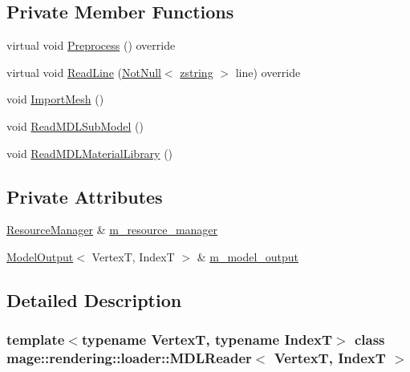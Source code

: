 \subsection*{Private Member Functions}
\begin{DoxyCompactItemize}
\item 
virtual void \mbox{\hyperlink{classmage_1_1rendering_1_1loader_1_1_m_d_l_reader_a397f0c0eedc56c983fc3a7074aa4e577}{Preprocess}} () override
\item 
virtual void \mbox{\hyperlink{classmage_1_1rendering_1_1loader_1_1_m_d_l_reader_a121bfa0a48d01bdc37cf09b7f3a25a27}{Read\+Line}} (\mbox{\hyperlink{namespacemage_a8769f9d670d6b585ea306cb1062af94b}{Not\+Null}}$<$ \mbox{\hyperlink{namespacemage_a4163ec9a9a27d5e7f4b452dcb99cb2b9}{zstring}} $>$ line) override
\item 
void \mbox{\hyperlink{classmage_1_1rendering_1_1loader_1_1_m_d_l_reader_a512618ed9e79671dbcb468d155272b7e}{Import\+Mesh}} ()
\item 
void \mbox{\hyperlink{classmage_1_1rendering_1_1loader_1_1_m_d_l_reader_afe15d41185ac5f4de6607561d7068d8c}{Read\+M\+D\+L\+Sub\+Model}} ()
\item 
void \mbox{\hyperlink{classmage_1_1rendering_1_1loader_1_1_m_d_l_reader_a40697c5c645e00ba6f4cc5cd28872b8f}{Read\+M\+D\+L\+Material\+Library}} ()
\end{DoxyCompactItemize}
\subsection*{Private Attributes}
\begin{DoxyCompactItemize}
\item 
\mbox{\hyperlink{classmage_1_1rendering_1_1_resource_manager}{Resource\+Manager}} \& \mbox{\hyperlink{classmage_1_1rendering_1_1loader_1_1_m_d_l_reader_ae1a276e89104344daa25666e4b074643}{m\+\_\+resource\+\_\+manager}}
\item 
\mbox{\hyperlink{structmage_1_1rendering_1_1_model_output}{Model\+Output}}$<$ VertexT, IndexT $>$ \& \mbox{\hyperlink{classmage_1_1rendering_1_1loader_1_1_m_d_l_reader_aab6301fae258aaea1619856000a29e53}{m\+\_\+model\+\_\+output}}
\end{DoxyCompactItemize}


\subsection{Detailed Description}
\subsubsection*{template$<$typename VertexT, typename IndexT$>$\newline
class mage\+::rendering\+::loader\+::\+M\+D\+L\+Reader$<$ Vertex\+T, Index\+T $>$}

